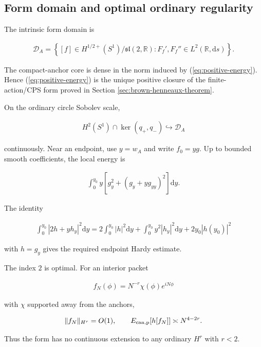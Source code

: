 \subsection{Form domain and optimal ordinary regularity}\label{subsec:form-domain}

The intrinsic form domain is

\begin{align}
\mathscr D_A
=\left\{
[f]\in H^{1/2+}(S^1)/\mathfrak{sl}(2,\mathbb R):
F_f',F_f''\in L^2(\mathbb R,\mathrm ds)
\right\}. \label{eq:form-domain}
\end{align}

The compact-anchor core is dense in the norm induced by (\ref{eq:positive-energy}). Hence (\ref{eq:positive-energy}) is the unique positive closure of the finite-action/CPS form proved in Section \ref{sec:brown-henneaux-theorem}.

On the ordinary circle Sobolev scale,

\begin{align}
H^2(S^1)\cap\ker(q_+,q_-)
\hookrightarrow\mathscr D_A
\end{align}

continuously. Near an endpoint, use $y=w_A$ and write $f_0=yg$. Up to bounded smooth coefficients, the local energy is

\begin{align}
\int_0^{y_0}y
\left[g_y^2+(g_y+yg_{yy})^2\right]\mathrm dy .
\end{align}

The identity

\begin{align}
\int_0^{y_0}|2h+yh_y|^2\mathrm dy
=2\int_0^{y_0}|h|^2\mathrm dy
+\int_0^{y_0}y^2|h_y|^2\mathrm dy
+2y_0|h(y_0)|^2 \label{eq:hardy-identity}
\end{align}

with $h=g_y$ gives the required endpoint Hardy estimate.

The index $2$ is optimal. For an interior packet

\begin{align}
f_N(\phi)=N^{-r}\chi(\phi)e^{iN\phi}
\end{align}

with $\chi$ supported away from the anchors,

\begin{align}
\|f_N\|_{H^r}=O(1),
\qquad
E_{{\rm can,p}}[h[f_N]]\asymp N^{4-2r}.
\end{align}

Thus the form has no continuous extension to any ordinary $H^r$ with $r<2$.

